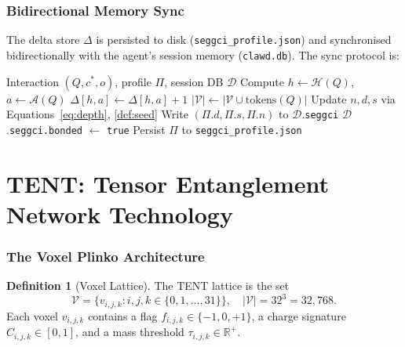 \documentclass[11pt,twoside]{article}
\theoremstyle{plain}
\theoremstyle{definition}
\newtheorem{definition}[theorem]{Definition}
\theoremstyle{remark}
\begin{document}
\section{Bidirectional Memory Sync}

The delta store $\Delta$ is persisted to disk (\texttt{seggci\_profile.json})
and synchronised bidirectionally with the agent's session memory
(\texttt{clawd.db}).  The sync protocol is:

\begin{algorithm}[h!]
\caption{LAC Bidirectional Sync}\label{alg:sync}
\begin{algorithmic}[1]
\Require Interaction $(Q,c^*,o)$, profile $\Pi$, session DB $\mathcal{D}$
\State Compute $h\gets\mathcal{H}(Q)$, $a\gets\mathcal{A}(Q)$
  \State $\Delta[h,a] \gets \Delta[h,a] + 1$
  \State $|\mathcal{V}| \gets |\mathcal{V}\cup\mathrm{tokens}(Q)|$
\EndIf
\State Update $n,d,s$ via Equations~\eqref{eq:depth}, \eqref{def:seed}
\State Write $(\Pi.d, \Pi.s, \Pi.n)$ to $\mathcal{D}$.\texttt{seggci}
  \State $\mathcal{D}$.\texttt{seggci.bonded} $\gets$ \texttt{true}
\EndIf
\State Persist $\Pi$ to \texttt{seggci\_profile.json}
\end{algorithmic}
\end{algorithm}

\part{TENT: Tensor Entanglement Network Technology}

\section{The Voxel Plinko Architecture}

\begin{definition}[Voxel Lattice]\label{def:lattice}
The TENT lattice is the set
\begin{equation}
  \mathcal{V} = \{v_{i,j,k} : i,j,k\in\{0,1,\ldots,31\}\},\quad |\mathcal{V}|=32^3=32{,}768.
\end{equation}
Each voxel $v_{i,j,k}$ contains a flag $f_{i,j,k}\in\{-1,0,+1\}$, a charge
signature $C_{i,j,k}\in[0,1]$, and a mass threshold $\tau_{i,j,k}\in\mathbb{R}^+$.
\end{definition}
\end{document}
